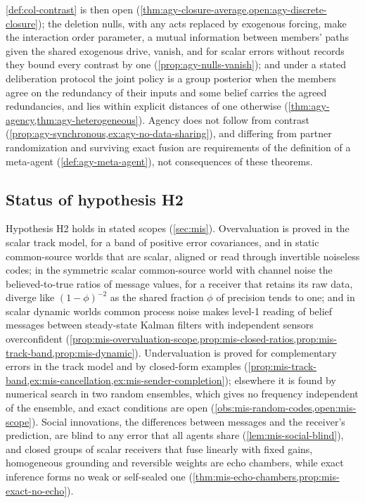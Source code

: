 \cref{def:col-contrast} is then open (\cref{thm:agy-closure-average,open:agy-discrete-closure}); the deletion nulls, with any acts replaced by exogenous forcing, make the interaction order parameter, a mutual information between members' paths given the shared exogenous drive, vanish, and for scalar errors without records they bound every contrast by one (\cref{prop:agy-nulls-vanish}); and under a stated deliberation protocol the joint policy is a group posterior when the members agree on the redundancy of their inputs and some belief carries the agreed redundancies, and lies within explicit distances of one otherwise (\cref{thm:agy-agency,thm:agy-heterogeneous}). Agency does not follow from contrast (\cref{prop:agy-synchronous,ex:agy-no-data-sharing}), and differing from partner randomization and surviving exact fusion are requirements of the definition of a meta-agent (\cref{def:agy-meta-agent}), not consequences of these theorems.

\subsection{Status of hypothesis H2}\label{sup:int-status-of-hypothesis-h2}

Hypothesis H2 holds in stated scopes (\cref{sec:mis}). Overvaluation is proved in the scalar track model, for a band of positive error covariances, and in static common-source worlds that are scalar, aligned or read through invertible noiseless codes; in the symmetric scalar common-source world with channel noise the believed-to-true ratios of message values, for a receiver that retains its raw data, diverge like $(1-\phi)^{-2}$ as the shared fraction $\phi$ of precision tends to one; and in scalar dynamic worlds common process noise makes level-1 reading of belief messages between steady-state Kalman filters with independent sensors overconfident (\cref{prop:mis-overvaluation-scope,prop:mis-closed-ratios,prop:mis-track-band,prop:mis-dynamic}). Undervaluation is proved for complementary errors in the track model and by closed-form examples (\cref{prop:mis-track-band,ex:mis-cancellation,ex:mis-sender-completion}); elsewhere it is found by numerical search in two random ensembles, which gives no frequency independent of the ensemble, and exact conditions are open (\cref{obs:mis-random-codes,open:mis-scope}). Social innovations, the differences between messages and the receiver's prediction, are blind to any error that all agents share (\cref{lem:mis-social-blind}), and closed groups of scalar receivers that fuse linearly with fixed gains, homogeneous grounding and reversible weights are echo chambers, while exact inference forms no weak or self-sealed one (\cref{thm:mis-echo-chambers,prop:mis-exact-no-echo}).

